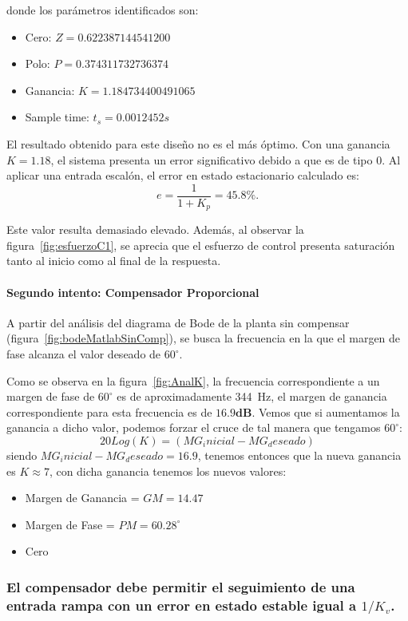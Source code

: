 \noindent
donde los parámetros identificados son:
\begin{itemize}
	\item Cero: $Z = 0.622387144541200$
	\item Polo: $P = 0.374311732736374$
	\item Ganancia: $K = 1.184734400491065$
	\item Sample time: $t_s = 0.0012452 s$
\end{itemize}




El resultado obtenido para este diseño no es el más óptimo. Con una ganancia $K = 1.18$, el sistema presenta un error significativo debido a que es de tipo $0$. Al aplicar una entrada escalón, el error en estado estacionario calculado es:
\[
e = \frac{1}{1+K_p} = 45.8\%.
\]

Este valor resulta demasiado elevado. Además, al observar la figura~\ref{fig:esfuerzoC1}, se aprecia que el esfuerzo de control presenta saturación tanto al inicio como al final de la respuesta.  

\paragraph{Segundo intento: Compensador Proporcional}  

A partir del análisis del diagrama de Bode de la planta sin compensar (figura~\ref{fig:bodeMatlabSinComp}), se busca la frecuencia en la que el margen de fase alcanza el valor deseado de $60^\circ$.


Como se observa en la figura~\ref{fig:AnalK}, la frecuencia correspondiente a un margen de fase de $60^\circ$ es de aproximadamente \SI{344}{Hz}, el margen de ganancia correspondiente para esta frecuencia es de $16.9\textbf{dB}$. Vemos que si aumentamos la ganancia a dicho valor, podemos forzar el cruce de tal manera que tengamos $60^\circ$:
\[
	20Log(K) = (MG_inicial - MG_deseado)
\]
siendo $MG_inicial - MG_deseado = 16.9$, tenemos entonces que la nueva ganancia es $K \approx 7$, con dicha ganancia tenemos los nuevos valores:
\begin{itemize}
	\item Margen de Ganancia = $GM = 14.47$
	\item Margen de Fase = $PM = 60.28^\circ$
	\item Cero
\end{itemize}

\subsubsection{El compensador debe permitir el seguimiento de una entrada rampa con un error en estado estable igual a $1/K_v$.}



